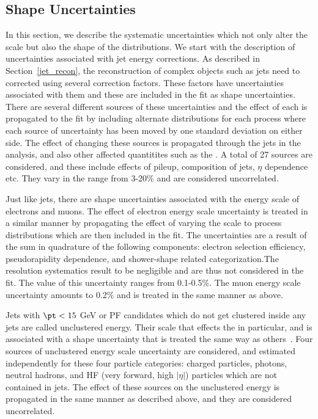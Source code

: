 \subsection{Shape Uncertainties}
In this section, we describe the systematic uncertainties which not only alter the scale but also the shape of the distributions. We start with the description of uncertainties associated with jet energy corrections. As described in Section~\ref{jet_recon}, the reconstruction of complex objects such as jets need to corrected using several correction factors. These factors have uncertainties associated with them and these are included in the fit as shape uncertainties. There are several different sources of these uncertainties and the effect of each is propagated to the fit by including alternate distributions for each process where each source of uncertainty has been moved by one standard deviation on either side. The effect of changing these sources is propagated through the jets in the analysis, and also other affected quantitites such as the \ptmiss. A total of 27 sources are considered, and these include effects of pileup, composition of jets, $\eta$ dependence etc. They vary in the range from 3-20\% and are considered uncorrelated.

Just like jets, there are shape uncertainties associated with the energy scale of electrons and muons. The effect of electron energy scale uncertainty is treated in a similar manner by propagating the effect of varying the scale to process distributions which are then included in the fit. The uncertainties are a result of the sum in quadrature of the following components: electron selection efficiency, pseudorapidity dependence, and shower-shape related categorization.The resolution systematics result to be negligible and are thus not considered in the fit. The value of this uncertainty ranges from 0.1-0.5\%. The muon energy scale uncertainty amounts to 0.2\% and is treated in the same manner as above.

Jets with $\pt<15$ GeV or PF candidates which do not get clustered inside any jets are called unclustered energy. Their scale that effects the \ptmiss in particular, and is associated with a shape uncertainty that is treated the same way as others~\cite{Sirunyan:2019kia}. Four sources of unclustered energy scale uncertainty are considered, and estimated independently for these four particle categories: charged particles, photons, neutral hadrons, and HF (very forward, high $|\eta|$) particles which are not contained in jets. The effect of these sources on the unclustered energy is propagated in the same manner as described above, and they are considered uncorrelated.

